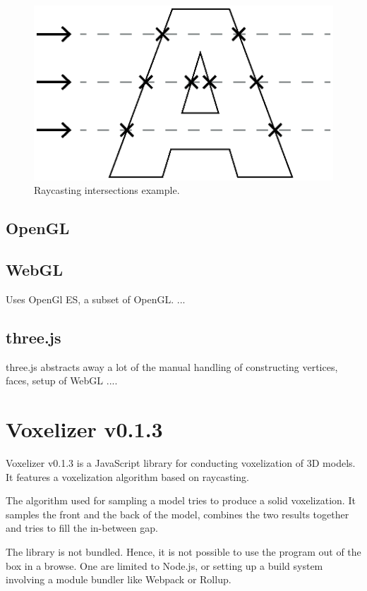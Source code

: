 \begin{figure}[h]
    \centering
    \includegraphics[scale=0.8]{sections/theory/figures/raycast-intersections}
    \caption{Raycasting intersections example.}
    \label{fig:raycasting-intersections-example}
\end{figure}

\subsection{OpenGL}

\subsection{WebGL}
Uses OpenGl ES, a subset of OpenGL. ...

\subsection{three.js}
three.js abstracts away a lot of the manual handling of constructing vertices, faces, setup of WebGL ....

\section{Voxelizer v0.1.3}
Voxelizer v0.1.3 is a JavaScript library for conducting voxelization of 3D models. It features a voxelization algorithm based on raycasting. 

The algorithm used for sampling a model tries to produce a solid voxelization. It samples the front and the back of the model, combines the two results together and tries to fill the in-between gap.

The library is not bundled. Hence, it is not possible to use the program out of the box in a browse. One are limited to Node.js, or setting up a build system involving a module bundler like Webpack or Rollup.

